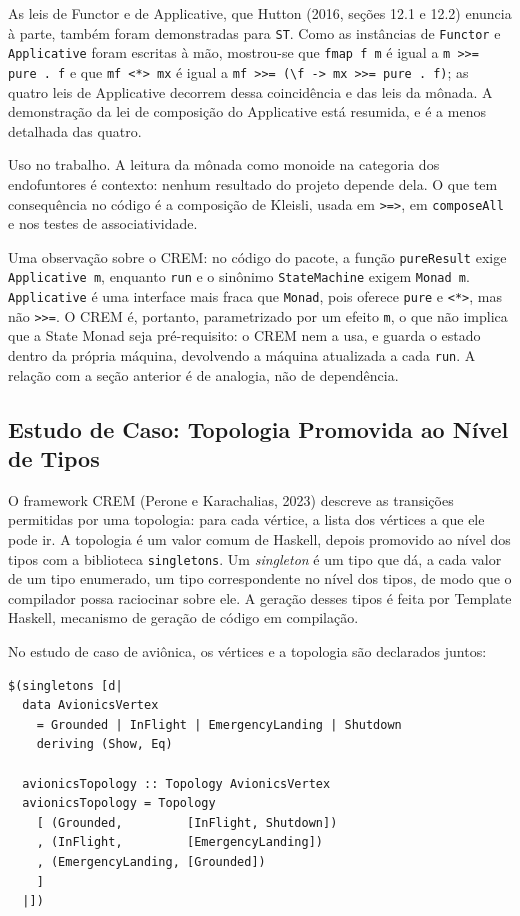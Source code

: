 \documentclass[12pt,a4paper]{article}
\begin{document}
As leis de Functor e de Applicative, que Hutton (2016, seções 12.1 e 12.2) enuncia à parte, também foram demonstradas para \texttt{ST}. Como as instâncias de \texttt{Functor} e \texttt{Applicative} foram escritas à mão, mostrou-se que \texttt{fmap f m} é igual a \texttt{m >>= pure . f} e que \texttt{mf <*> mx} é igual a \texttt{mf >>= (\textbackslash f -> mx >>= pure . f)}; as quatro leis de Applicative decorrem dessa coincidência e das leis da mônada. A demonstração da lei de composição do Applicative está resumida, e é a menos detalhada das quatro.

Uso no trabalho. A leitura da mônada como monoide na categoria dos endofuntores é contexto: nenhum resultado do projeto depende dela. O que tem consequência no código é a composição de Kleisli, usada em \texttt{>=>}, em \texttt{composeAll} e nos testes de associatividade.

Uma observação sobre o CREM: no código do pacote, a função \texttt{pureResult} exige \texttt{Applicative m}, enquanto \texttt{run} e o sinônimo \texttt{StateMachine} exigem \texttt{Monad m}. \texttt{Applicative} é uma interface mais fraca que \texttt{Monad}, pois oferece \texttt{pure} e \texttt{<*>}, mas não \texttt{>>=}. O CREM é, portanto, parametrizado por um efeito \texttt{m}, o que não implica que a State Monad seja pré-requisito: o CREM nem a usa, e guarda o estado dentro da própria máquina, devolvendo a máquina atualizada a cada \texttt{run}. A relação com a seção anterior é de analogia, não de dependência.

\subsection{Estudo de Caso: Topologia Promovida ao Nível de Tipos}

O framework CREM (Perone e Karachalias, 2023) descreve as transições permitidas por uma topologia: para cada vértice, a lista dos vértices a que ele pode ir. A topologia é um valor comum de Haskell, depois promovido ao nível dos tipos com a biblioteca \texttt{singletons}. Um \textit{singleton} é um tipo que dá, a cada valor de um tipo enumerado, um tipo correspondente no nível dos tipos, de modo que o compilador possa raciocinar sobre ele. A geração desses tipos é feita por Template Haskell, mecanismo de geração de código em compilação.

No estudo de caso de aviônica, os vértices e a topologia são declarados juntos:

\begin{verbatim}
$(singletons [d|
  data AvionicsVertex
    = Grounded | InFlight | EmergencyLanding | Shutdown
    deriving (Show, Eq)

  avionicsTopology :: Topology AvionicsVertex
  avionicsTopology = Topology
    [ (Grounded,         [InFlight, Shutdown])
    , (InFlight,         [EmergencyLanding])
    , (EmergencyLanding, [Grounded])
    ]
  |])
\end{verbatim}
\end{document}

